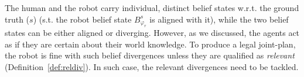 \documentclass[letterpaper]{article} %
\begin{document}





The human and the robot carry individual, distinct belief states w.r.t. the ground truth ($s$) (s.t. the robot belief state $\mathit{B}_{\varphi_r}^s$ is aligned with it), while the two belief states can be either aligned or diverging. 
However, as we discussed, the agents act as if they are certain about their world knowledge.
To produce a legal joint-plan, the robot is fine with such belief divergences unless they are qualified as \textit{relevant} (Definition~\ref{def:reldiv}). 
In such case, the relevant divergences need to be tackled.
\end{document}

